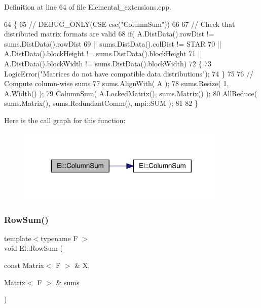 Definition at line 64 of file Elemental\+\_\+extensions.\+cpp.


\begin{DoxyCode}
64                                                                 \{
65 \textcolor{comment}{//    DEBUG\_ONLY(CSE cse("ColumnSum"))}
66 
67     \textcolor{comment}{// Check that distributed matrix formats are valid}
68     \textcolor{keywordflow}{if}( A.DistData().rowDist != sums.DistData().rowDist
69         || sums.DistData().colDist != STAR 
70         || A.DistData().blockHeight != sums.DistData().blockHeight
71         || A.DistData().blockWidth != sums.DistData().blockWidth)
72     \{
73         LogicError(\textcolor{stringliteral}{"Matrices do not have compatible data distributions"});
74     \}
75 
76     \textcolor{comment}{// Compute column-wise sums}
77     sums.AlignWith( A );
78     sums.Resize( 1, A.Width() );
79     \hyperlink{namespaceEl_ad446b5d330cc5ae121cc2eef632c4118}{ColumnSum}( A.LockedMatrix(), sums.Matrix() );
80     AllReduce( sums.Matrix(), sums.RedundantComm(), mpi::SUM );
81 
82 \}
\end{DoxyCode}
Here is the call graph for this function\+:\nopagebreak
\begin{figure}[H]
\begin{center}
\leavevmode
\includegraphics[width=287pt]{namespaceEl_ad446b5d330cc5ae121cc2eef632c4118_cgraph}
\end{center}
\end{figure}
\mbox{\label{namespaceEl_a584f088a3325a8222d4d6ac37be04b04}} 
\subsubsection{\texorpdfstring{Row\+Sum()}{RowSum()}\hspace{0.1cm}{\footnotesize\ttfamily [1/2]}}
{\footnotesize\ttfamily template$<$typename F $>$ \\
void El\+::\+Row\+Sum (\begin{DoxyParamCaption}\item[{const Matrix$<$ F $>$ \&}]{X,  }\item[{Matrix$<$ F $>$ \&}]{sums }\end{DoxyParamCaption})}



